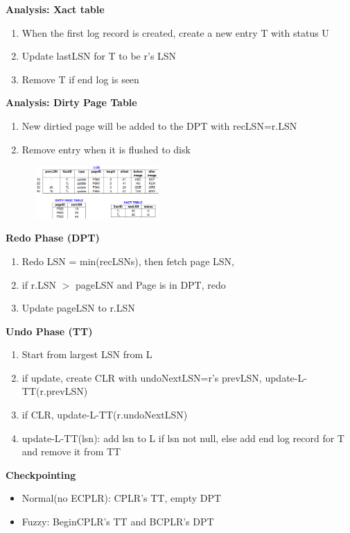\documentclass[10pt, landscape]{article}
\begin{document}
\begin{multicols}{4}
\textbf{Analysis: Xact table} \\
\begin{enumerate}
  \item When the first log record is created, create a new entry T with status U
  \item Update lastLSN for T to be r's LSN
  \item Remove T if end log is seen
\end{enumerate}

\textbf{Analysis: Dirty Page Table} \\
\begin{enumerate}
  \item New dirtied page will be added to the DPT with recLSN=r.LSN
  \item Remove entry when it is flushed to disk
\end{enumerate}

\includegraphics[width=7cm, height =2cm]{analysis_log.png}

\textbf{Redo Phase (DPT)} \\
\begin{enumerate}
  \item Redo LSN = min(recLSNs), then fetch page LSN, 
  \item if r.LSN $>$ pageLSN and Page is in DPT, redo
  \item Update pageLSN to r.LSN
\end{enumerate}

\textbf{Undo Phase (TT)} \\
\begin{enumerate}
  \item Start from largest LSN from L
  \item if update, create CLR with undoNextLSN=r's prevLSN, update-L-TT(r.prevLSN)
  \item if CLR, update-L-TT(r.undoNextLSN)
  \item update-L-TT(lsn): add lsn to L if lsn not null, else add end log record for T and remove it from TT
\end{enumerate}

\textbf{Checkpointing} \\
\begin{itemize}
  \item Normal(no ECPLR): CPLR's TT, empty DPT
  \item Fuzzy: BeginCPLR's TT and BCPLR's DPT  
\end{itemize}

\end{multicols}
\end{document}
